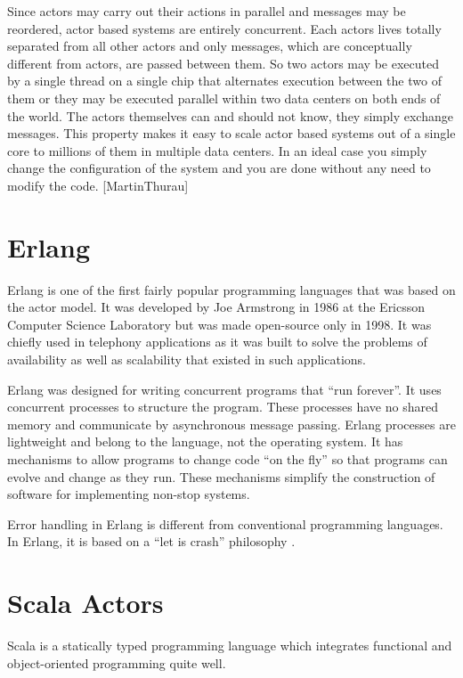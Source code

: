 Since actors may carry out their actions in parallel and messages may be reordered, actor based systems are entirely concurrent. Each actors lives totally separated from all other actors and only messages, which are conceptually different from actors, are passed between them. So two actors may be executed by a single thread on a single chip that alternates execution between the two of them or they may be executed parallel within two data centers on both ends of the world. The actors themselves can and should not know, they simply exchange messages. This property makes it easy to scale actor based systems out of a single core to millions of them in multiple data centers. In an ideal case you simply change the configuration of the system and you are done without any need to modify the code. [MartinThurau]

\section{Erlang}
Erlang is one of the first fairly popular programming languages that was based on the actor model.\cite{vinoski} It was developed by Joe Armstrong in 1986 at the Ericsson Computer Science Laboratory but was made open-source only in 1998. It was chiefly used in telephony applications as it was built to solve the problems of availability as well as scalability that existed in such applications.~\parencite{armstrong}

Erlang was designed for writing concurrent programs that “run forever”. It uses concurrent processes to structure the program. These processes have no shared memory and communicate by asynchronous message passing. Erlang processes are lightweight and belong to the language, not the operating system. It has mechanisms to allow programs to change code “on the fly” so that programs can evolve and change as they run. These mechanisms simplify the construction of software for implementing non-stop systems.~\parencite{armstrong}

Error handling in Erlang is different from conventional programming languages. In Erlang, it is based on a “let is crash” philosophy \cite{armstrong}.

\section{Scala Actors}
Scala is a statically typed programming language which integrates functional and object-oriented programming quite well.\cite{Odersky}

